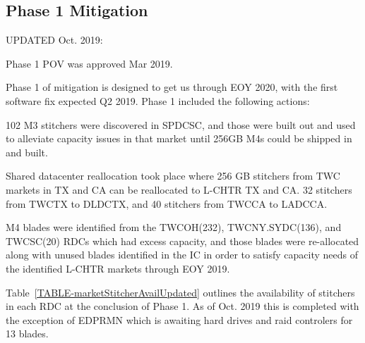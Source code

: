 \documentclass{article}
\begin{document}
\subsection{Phase 1 Mitigation}
\label{SECTION-Phase1}

UPDATED Oct. 2019: 

Phase 1 POV was approved Mar 2019.

Phase 1 of mitigation is designed to get us through EOY 2020, with the first software fix expected Q2 2019. Phase 1 included the following actions: 

102 M3 stitchers were discovered in SPDCSC, and those were built out and used to alleviate capacity issues in that market until 256GB M4s could be shipped in and built. 

Shared datacenter reallocation took place where 256 GB stitchers from TWC markets in TX and CA can be reallocated to L-CHTR TX and CA. 32 stitchers from TWCTX to DLDCTX, and 40 stitchers from TWCCA to LADCCA. 

M4 blades were identified from the TWCOH(232), TWCNY.SYDC(136), and TWCSC(20) RDCs which had excess capacity, and those blades were re-allocated along with unused blades identified in the IC in order to satisfy capacity needs of the identified L-CHTR markets through EOY 2019. 

Table~\ref{TABLE-marketStitcherAvailUpdated} outlines the availability of stitchers in each RDC at the conclusion of Phase 1. As of Oct. 2019 this is completed with the exception of EDPRMN which is awaiting hard drives and raid controlers for 13 blades. 
\end{document}
